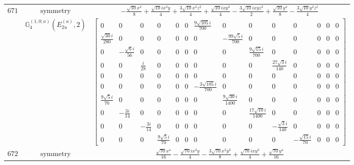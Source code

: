 \documentclass[fleqn,8pt,landscape]{jsarticle}
\begin{document}
\begin{longtable}{ccc}
$ 671 $ & $ \text{symmetry} $ & $ - \frac{\sqrt{10} x^{4}}{8} + \frac{\sqrt{10} i x^{3} y}{4} + \frac{3 \sqrt{10} x^{2} z^{2}}{4} + \frac{\sqrt{10} i x y^{3}}{4} - \frac{3 \sqrt{10} i x y z^{2}}{2} + \frac{\sqrt{10} y^{4}}{8} - \frac{3 \sqrt{10} y^{2} z^{2}}{4} $ \\
$  $ & $ \mathbb{G}_{4}^{(1,0;a)}(E_{2u}^{(a)},2) $ & $ \begin{bmatrix} 0 & 0 & 0 & 0 & 0 & 0 & \frac{9 \sqrt{105} i}{700} & 0 & 0 & 0 & 0 & 0 & 0 & 0 \\ \frac{\sqrt{30} i}{280} & 0 & 0 & 0 & 0 & 0 & 0 & - \frac{99 \sqrt{5} i}{700} & 0 & 0 & 0 & 0 & 0 & 0 \\ 0 & - \frac{\sqrt{6} i}{56} & 0 & 0 & 0 & 0 & 0 & 0 & \frac{9 \sqrt{15} i}{700} & 0 & 0 & 0 & 0 & 0 \\ 0 & 0 & \frac{i}{28} & 0 & 0 & 0 & 0 & 0 & 0 & \frac{27 \sqrt{3} i}{140} & 0 & 0 & 0 & 0 \\ 0 & 0 & 0 & 0 & 0 & 0 & 0 & 0 & 0 & 0 & 0 & 0 & 0 & 0 \\ 0 & 0 & 0 & 0 & 0 & 0 & - \frac{3 \sqrt{105} i}{700} & 0 & 0 & 0 & 0 & 0 & 0 & 0 \\ \frac{9 \sqrt{5} i}{70} & 0 & 0 & 0 & 0 & 0 & 0 & \frac{9 \sqrt{30} i}{1400} & 0 & 0 & 0 & 0 & 0 & 0 \\ 0 & - \frac{3 i}{14} & 0 & 0 & 0 & 0 & 0 & 0 & \frac{17 \sqrt{10} i}{1400} & 0 & 0 & 0 & 0 & 0 \\ 0 & 0 & - \frac{3 i}{14} & 0 & 0 & 0 & 0 & 0 & 0 & - \frac{\sqrt{3} i}{140} & 0 & 0 & 0 & 0 \\ 0 & 0 & 0 & \frac{9 \sqrt{5} i}{70} & 0 & 0 & 0 & 0 & 0 & 0 & - \frac{\sqrt{15} i}{70} & 0 & 0 & 0 \end{bmatrix} $ \\ \hline
$ 672 $ & $ \text{symmetry} $ & $ \frac{\sqrt{70} x^{4}}{16} - \frac{\sqrt{70} i x^{3} y}{4} - \frac{3 \sqrt{70} x^{2} y^{2}}{8} + \frac{\sqrt{70} i x y^{3}}{4} + \frac{\sqrt{70} y^{4}}{16} $ \\

\end{longtable}
\end{document}
